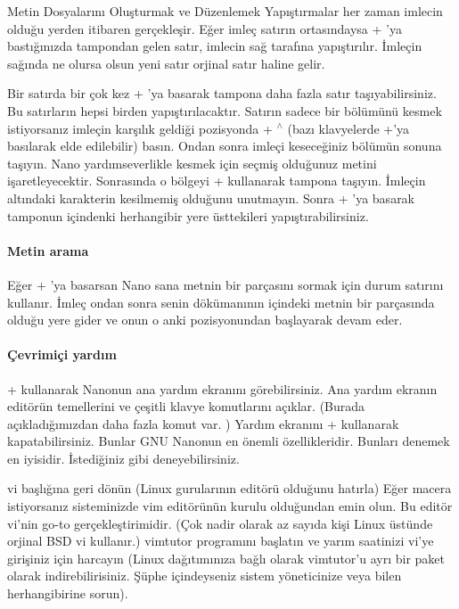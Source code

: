 \begin{section}{Metin Dosyalarını Oluşturmak ve Düzenlemek}
Yapıştırmalar her zaman imlecin olduğu yerden itibaren gerçekleşir. Eğer imleç satırın ortasındaysa \Ctrl + 'ya bastığınızda tampondan gelen satır, imlecin sağ tarafına yapıştırılır. İmleçin sağında ne olursa olsun yeni satır orjinal satır haline gelir. 

Bir satırda bir çok kez \Ctrl + 'ya basarak tampona daha fazla satır taşıyabilirsiniz. Bu satırların hepsi birden yapıştırılacaktır.
Satırın sadece bir bölümünü kesmek istiyorsanız imleçin karşılık geldiği pozisyonda \Ctrl + $ ^\wedge $ (bazı klavyelerde \Alt+'ya basılarak elde edilebilir) basın. Ondan sonra imleçi keseceğiniz bölümün sonuna taşıyın. Nano yardımseverlikle kesmek için seçmiş olduğunuz metini işaretleyecektir. Sonrasında o bölgeyi \Ctrl +  kullanarak tampona taşıyın. İmleçin altındaki karakterin kesilmemiş olduğunu unutmayın. Sonra \Ctrl + 'ya basarak tamponun içindenki herhangibir yere üsttekileri yapıştırabilirsiniz. 

\paragraph{Metin arama}{Eğer \Ctrl + 'ya basarsan Nano sana metnin bir parçasını sormak için durum satırını kullanır. İmleç ondan sonra senin dökümanının içindeki metnin bir parçasında olduğu yere gider ve onun o anki pozisyonundan başlayarak devam eder.}

\paragraph{Çevrimiçi yardım}{\Ctrl +  kullanarak Nanonun ana yardım ekranını görebilirsiniz. Ana yardım ekranın editörün temellerini ve çeşitli klavye komutlarını açıklar. (Burada açıkladığımızdan daha fazla komut var. ) Yardım ekranını \Ctrl +  kullanarak kapatabilirsiniz.
Bunlar GNU Nanonun en önemli özellikleridir. Bunları denemek en iyisidir. İstediğiniz gibi deneyebilirsiniz.}

vi başlığına geri dönün (Linux gurularının editörü olduğunu hatırla) Eğer macera istiyorsanız sisteminizde vim editörünün kurulu olduğundan emin olun. Bu editör vi’nin go-to gerçekleştirimidir. (Çok nadir olarak az sayıda kişi Linux üstünde orjinal BSD vi kullanır.) vimtutor programını başlatın ve yarım saatinizi vi’ye girişiniz için harcayın (Linux dağıtımınıza bağlı olarak vimtutor’u ayrı bir paket olarak indirebilirisiniz. Şüphe içindeyseniz sistem yöneticinize veya bilen herhangibirine sorun).


\end{section}

